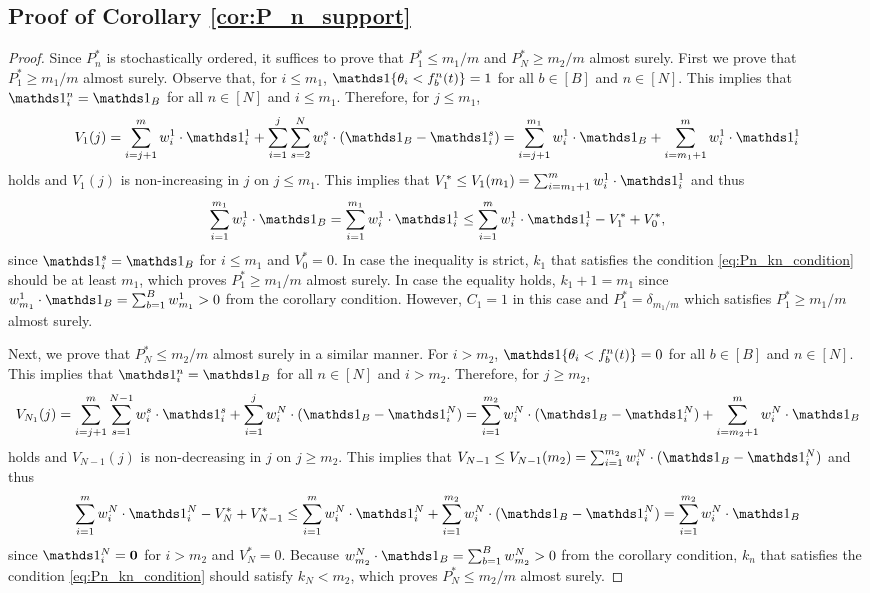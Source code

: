 \subsection{Proof of Corollary \ref{cor:P_n_support}} \label{pf:P_n_support}
\begin{proof}
  Since $P_n^*$ is stochastically ordered, it suffices to prove that $P_1^* \leq m_1 / m$ and $P_N^* \geq m_2 / m$ almost surely.
  First we prove that $P_1^* \geq m_1 / m$ almost surely. Observe that, for $i \leq m_1$, $\indi{\theta_i < f_b^n(t)} = 1$ for all $b \in [B]$ and $n \in [N]$. This implies that $\one_i^n = \one_B$ for all $n \in [N]$ and $i \leq m_1$. Therefore, for $j \leq m_1$,
  \[
  V_1(j) = \sum_{i=j+1}^m w_i^1 \cdot \one_i^1 + \sum_{i=1}^j \sum_{s=2}^N w_i^s \cdot (\one_B - \one_i^s) 
  = \sum_{i=j+1}^{m_1} w_i^1 \cdot \one_B + \sum_{i=m_1+1}^{m} w_i^1 \cdot \one_i^1
  \]
  holds and $V_1(j)$ is non-increasing in $j$ on $j \leq m_1$. This implies that $V_1^* \leq V_1(m_1) = \sum_{i=m_1+1}^m w_i^1 \cdot \one_i^1$ and thus 
  \[
  \sum_{i=1}^{m_1} w_i^1 \cdot \one_B 
  = \sum_{i=1}^{m_1} w_i^1 \cdot \one_i^1 
  \leq \sum_{i=1}^m w_i^1 \cdot \one_i^1 - V_1^* + V_0^*, 
  \] 
  since $\one_i^s = \one_B$ for $i \leq m_1$ and $V_0^* = 0$. 
  In case the inequality is strict, $k_1$ that satisfies the condition \eqref{eq:Pn_kn_condition} should be at least $m_1$, which proves $P_1^* \geq m_1 / m$ almost surely. In case the equality holds, $k_1+1 = m_1$ since $w_{m_1}^1 \cdot \one_B = \sum_{b=1}^B w_{m_1}^1 > 0$ from the corollary condition. However, $C_1 = 1$ in this case and $P_1^* = \delta_{m_1 / m}$ which satisfies $P_1^* \geq m_1 / m$ almost surely.
  
  Next, we prove that $P_N^* \leq m_2 / m$ almost surely in a similar manner. For $i > m_2$, $\indi{\theta_i < f_b^n(t)} = 0$ for all $b \in [B]$ and $n \in [N]$. This implies that $\one_i^n = \one_B$ for all $n \in [N]$ and $i > m_2$. Therefore, for $j \geq m_2$,
  \[
  V_{N_1}(j) = \sum_{i=j+1}^m \sum_{s=1}^{N-1} w_i^s \cdot \one_i^s + \sum_{i=1}^j w_i^N \cdot (\one_B - \one_i^N) 
  = \sum_{i=1}^{m_2} w_i^N \cdot (\one_B - \one_i^N) + \sum_{i=m_2+1}^{m} w_i^N \cdot \one_B
  \]
  holds and $V_{N-1}(j)$ is non-decreasing in $j$ on $j \geq m_2$. This implies that $V_{N-1} \leq V_{N-1}(m_2) = \sum_{i=1}^{m_2} w_i^N \cdot (\one_B - \one_i^N)$ and thus 
  \[
  \sum_{i=1}^m w_i^N \cdot \one_i^N - V_{N}^* + V_{N-1}^* 
  \leq \sum_{i=1}^m w_i^N \cdot \one_i^N + \sum_{i=1}^{m_2} w_i^N \cdot (\one_B - \one_i^N) 
  = \sum_{i=1}^{m_2} w_i^N \cdot \one_B
  \]
  since $\one_i^N = \mathbf{0}$ for $i > m_2$ and $V_N^* = 0$. Because $w_{m_2}^N \cdot \one_B = \sum_{b=1}^B w_{m_2}^N > 0$ from the corollary condition, $k_n$ that satisfies the condition \eqref{eq:Pn_kn_condition} should satisfy $k_N < m_2$, which proves $P_N^* \leq m_2 / m$ almost surely.
\end{proof}



